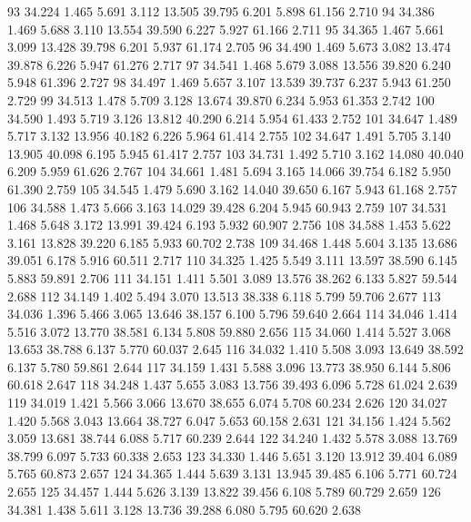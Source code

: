 \documentclass[a4paper,11pt]{scrartcl}
\begin{document}
\begin{Schunk}
\begin{Soutput}
93  34.224  1.465  5.691  3.112 13.505   39.795  6.201  5.898   61.156  2.710
94  34.386  1.469  5.688  3.110 13.554   39.590  6.227  5.927   61.166  2.711
95  34.365  1.467  5.661  3.099 13.428   39.798  6.201  5.937   61.174  2.705
96  34.490  1.469  5.673  3.082 13.474   39.878  6.226  5.947   61.276  2.717
97  34.541  1.468  5.679  3.088 13.556   39.820  6.240  5.948   61.396  2.727
98  34.497  1.469  5.657  3.107 13.539   39.737  6.237  5.943   61.250  2.729
99  34.513  1.478  5.709  3.128 13.674   39.870  6.234  5.953   61.353  2.742
100 34.590  1.493  5.719  3.126 13.812   40.290  6.214  5.954   61.433  2.752
101 34.647  1.489  5.717  3.132 13.956   40.182  6.226  5.964   61.414  2.755
102 34.647  1.491  5.705  3.140 13.905   40.098  6.195  5.945   61.417  2.757
103 34.731  1.492  5.710  3.162 14.080   40.040  6.209  5.959   61.626  2.767
104 34.661  1.481  5.694  3.165 14.066   39.754  6.182  5.950   61.390  2.759
105 34.545  1.479  5.690  3.162 14.040   39.650  6.167  5.943   61.168  2.757
106 34.588  1.473  5.666  3.163 14.029   39.428  6.204  5.945   60.943  2.759
107 34.531  1.468  5.648  3.172 13.991   39.424  6.193  5.932   60.907  2.756
108 34.588  1.453  5.622  3.161 13.828   39.220  6.185  5.933   60.702  2.738
109 34.468  1.448  5.604  3.135 13.686   39.051  6.178  5.916   60.511  2.717
110 34.325  1.425  5.549  3.111 13.597   38.590  6.145  5.883   59.891  2.706
111 34.151  1.411  5.501  3.089 13.576   38.262  6.133  5.827   59.544  2.688
112 34.149  1.402  5.494  3.070 13.513   38.338  6.118  5.799   59.706  2.677
113 34.036  1.396  5.466  3.065 13.646   38.157  6.100  5.796   59.640  2.664
114 34.046  1.414  5.516  3.072 13.770   38.581  6.134  5.808   59.880  2.656
115 34.060  1.414  5.527  3.068 13.653   38.788  6.137  5.770   60.037  2.645
116 34.032  1.410  5.508  3.093 13.649   38.592  6.137  5.780   59.861  2.644
117 34.159  1.431  5.588  3.096 13.773   38.950  6.144  5.806   60.618  2.647
118 34.248  1.437  5.655  3.083 13.756   39.493  6.096  5.728   61.024  2.639
119 34.019  1.421  5.566  3.066 13.670   38.655  6.074  5.708   60.234  2.626
120 34.027  1.420  5.568  3.043 13.664   38.727  6.047  5.653   60.158  2.631
121 34.156  1.424  5.562  3.059 13.681   38.744  6.088  5.717   60.239  2.644
122 34.240  1.432  5.578  3.088 13.769   38.799  6.097  5.733   60.338  2.653
123 34.330  1.446  5.651  3.120 13.912   39.404  6.089  5.765   60.873  2.657
124 34.365  1.444  5.639  3.131 13.945   39.485  6.106  5.771   60.724  2.655
125 34.457  1.444  5.626  3.139 13.822   39.456  6.108  5.789   60.729  2.659
126 34.381  1.438  5.611  3.128 13.736   39.288  6.080  5.795   60.620  2.638

\end{Soutput}
\end{Schunk}
\end{document}
